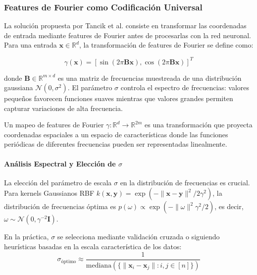 \subsubsection{Features de Fourier como Codificación Universal}

La solución propuesta por Tancik et al. consiste en transformar las coordenadas de entrada mediante features de Fourier antes de procesarlas con la red neuronal. Para una entrada $\mathbf{x} \in \mathbb{R}^d$, la transformación de features de Fourier se define como:

\begin{equation}
\gamma(\mathbf{x}) = \left[\sin(2\pi \mathbf{B}\mathbf{x}), \cos(2\pi \mathbf{B}\mathbf{x})\right]^T
\end{equation}

donde $\mathbf{B} \in \mathbb{R}^{m \times d}$ es una matriz de frecuencias muestreada de una distribución gaussiana $\mathcal{N}(0, \sigma^2)$. El parámetro $\sigma$ controla el espectro de frecuencias: valores pequeños favorecen funciones suaves mientras que valores grandes permiten capturar variaciones de alta frecuencia.

\begin{definition}
Un mapeo de features de Fourier $\gamma: \mathbb{R}^d \to \mathbb{R}^{2m}$ es una transformación que proyecta coordenadas espaciales a un espacio de características donde las funciones periódicas de diferentes frecuencias pueden ser representadas linealmente.
\end{definition}

\paragraph{Análisis Espectral y Elección de $\sigma$}

La elección del parámetro de escala $\sigma$ en la distribución de frecuencias es crucial. Para kernels Gaussianos RBF $k(\mathbf{x}, \mathbf{y}) = \exp(-\|\mathbf{x} - \mathbf{y}\|^2 / 2\gamma^2)$, la distribución de frecuencias óptima es $p(\omega) \propto \exp(-\|\omega\|^2 \gamma^2 / 2)$, es decir, $\omega \sim \mathcal{N}(0, \gamma^{-2} \mathbf{I})$.

En la práctica, $\sigma$ se selecciona mediante validación cruzada o siguiendo heurísticas basadas en la escala característica de los datos:
\begin{equation}
\sigma_{\text{óptimo}} \approx \frac{1}{\text{mediana}(\{\|\mathbf{x}_i - \mathbf{x}_j\| : i, j \in [n]\})}
\end{equation}

